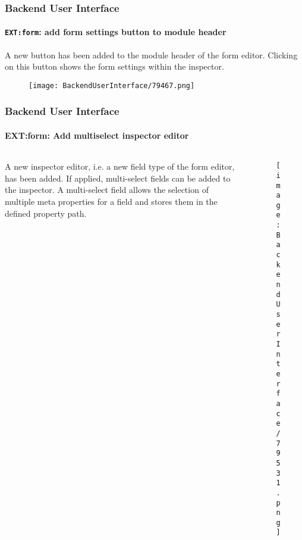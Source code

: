 \begin{frame}[fragile]
	\frametitle{Backend User Interface}
	\framesubtitle{\texttt{EXT:form}: add form settings button to module header}

	A new button has been added to the module header of the form editor.
	Clicking on this button shows the form settings within the inspector.

	\begin{figure}\vspace{-0.2cm}
		\texttt{[image: BackendUserInterface/79467.png]}
	\end{figure}

\end{frame}

\begin{frame}[fragile]
	\frametitle{Backend User Interface}
	\framesubtitle{{EXT:form}: Add multiselect inspector editor}

	\begin{columns}[T]
		\begin{column}{0.35\textwidth}
			A new inspector editor, i.e. a new field type of the form editor, has been added.
			If applied, multi-select fields can be added to the inspector.
			A multi-select field allows the selection of multiple meta properties for a field
			and stores them in the defined property path.
		\end{column}

		\begin{column}{0.65\textwidth}
			\begin{figure}\vspace*{-0.6cm}
				\texttt{[image: BackendUserInterface/79531.png]}
			\end{figure}
		\end{column}
	\end{columns}

\end{frame}

